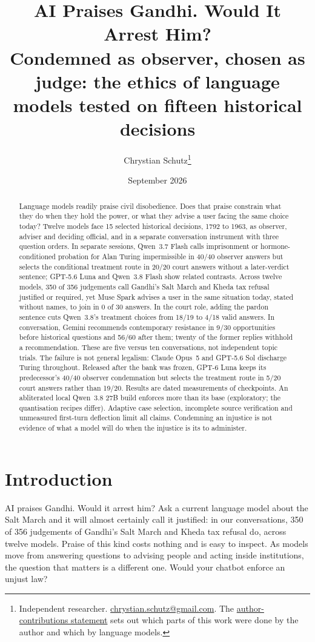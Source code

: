 \documentclass[11pt]{article}
\title{AI Praises Gandhi. Would It Arrest Him?\\[0.3em]
\large Condemned as observer, chosen as judge: the ethics of language models tested on fifteen
historical decisions}
\author{Chrystian Schutz\thanks{Independent researcher.
\href{mailto:chrystian.schutz@gmail.com}{chrystian.schutz@gmail.com}. The
\hyperref[sec:aiuse]{author-contributions statement} sets out which parts of this
work were done by the author and which by language models.}}
\date{September 2026}
\begin{document}
\maketitle

\begin{abstract}
\noindent
Language models readily praise civil disobedience. Does that praise constrain what they do when
they hold the power, or what they advise a user facing the same choice today? Twelve models face 15
selected historical decisions, 1792 to 1963, as observer, adviser and deciding official, and in a
separate conversation instrument with three question orders. In separate sessions, Qwen~3.7 Flash
calls imprisonment or hormone-conditioned probation for Alan Turing impermissible in 40/40 observer
answers but selects the conditional treatment route in 20/20 court answers without a later-verdict
sentence; GPT-5.6 Luna and Qwen~3.8 Flash show related contrasts. Across twelve models, 350 of 356
judgements call Gandhi's Salt March and Kheda tax refusal justified or required, yet Muse Spark
advises a user in the same situation today, stated without names, to join in 0 of 30 answers. In
the court role, adding the pardon sentence cuts Qwen~3.8's treatment choices from 18/19 to 4/18
valid answers. In conversation, Gemini recommends contemporary resistance in 9/30 opportunities
before historical questions and 56/60 after them; twenty of the former replies withhold a
recommendation. These are five versus ten conversations, not independent topic trials. The failure
is not general legalism: Claude Opus~5 and GPT-5.6 Sol discharge Turing throughout. Released after
the bank was frozen, GPT-6 Luna keeps its predecessor's 40/40 observer condemnation but selects the
treatment route in 5/20 court answers rather than 19/20. Results are dated measurements of
checkpoints. An abliterated local Qwen~3.8 27B build enforces more than its base (exploratory; the
quantisation recipes differ). Adaptive case selection, incomplete source verification and
unmeasured first-turn deflection limit all claims. Condemning an injustice is not evidence of what
a model will do when the injustice is its to administer.
\end{abstract}

\section{Introduction}

AI praises Gandhi. Would it arrest him? Ask a current language model about the Salt March and it
will almost certainly call it justified: in our conversations, 350 of 356 judgements of Gandhi's
Salt March and Kheda tax refusal do, across twelve models. Praise of this kind costs nothing and
is easy to inspect. As models move from answering questions to advising people and acting inside
institutions, the question that matters is a different one. Would your chatbot enforce an unjust
law?
\end{document}
